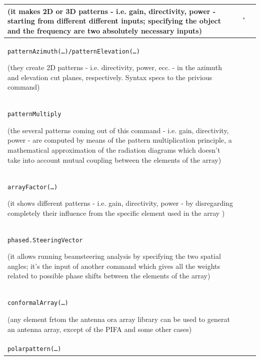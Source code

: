 \documentclass[10 pt,a4paper,twocolumn]{article}
\newcommand{\cmark}{\ding{51}}%
\newcommand{\xmark}{\ding{55}}%
\begin{document}
{\begin{table}[bt!]
\begin{center}
{\begin{tabular}{|m{15.5cm}|c|c|}
			\small{ {(it makes 2D or 3D patterns - i.e. gain, directivity, power -  starting from different different inputs; 
					specifying the object and the frequency are two absolutely necessary inputs)}}
			& \textcolor{ForestGreen}{\cmark} $\:^*$
			
		& \textcolor{ForestGreen}{\cmark} 
			
			{} \\
			\hline
			\colorbox{backcolour}{\texttt{patternAzimuth(\dots)/patternElevation(\dots)}}
			
			\small{ {(they create 2D patterns - i.e. directivity, power, ecc. - in the azimuth and elevation cut planes, respectively. Syntax specs to the privious command)}} & \textcolor{ForestGreen}{\cmark} & \textcolor{Mahogany}{\xmark} \\
			\hline
		\colorbox{backcolour}{\texttt{patternMultiply}}
			
			\small{{(the several patterns coming out of this command - i.e. gain, directivity, power - are computed by means of the pattern multiplication principle, a mathematical approximation of the radiation diagrams which doesn't take into account mutual coupling between the elements of the array)}} & \textcolor{Mahogany}{\xmark} &\textcolor{ForestGreen}{\cmark}  \\
			\hline
		\colorbox{backcolour}{\texttt{arrayFactor(\dots)}}
			
			\small{{(it shows different patterns - i.e. gain, directivity, power - by disregarding completely their influence from the specific element used in the array )}} &\textcolor{Mahogany}{\xmark} & \textcolor{ForestGreen}{\cmark} \\
			\hline
		\colorbox{backcolour}{\texttt{phased.SteeringVector}}
			
			\small{{(it allows running beamsteering analysis by specifying the two spatial angles; it's the input of another command which gives all the weights related to possible phase shifts between the elements of the array)}} & \textcolor{ForestGreen}{\cmark} & \textcolor{Mahogany}{\xmark} \\
			\hline
		\colorbox{backcolour}{\texttt{conformalArray(\dots)}}
			
			\small{{(any element frtom the antenna ora array library can be used to generat an antenna array, except of the PIFA and some other cases)}} & \textcolor{ForestGreen}{\cmark} & \textcolor{Mahogany}{\xmark} \\
			\hline
			\colorbox{backcolour}{\texttt{polarpattern(\dots)}}
			

\end{tabular}}
\end{center}
\end{table}}
\end{document}
